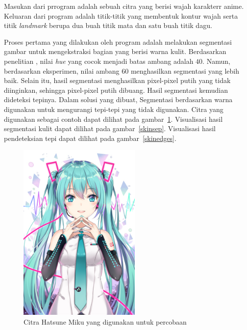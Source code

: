 \documentclass[conference, a4paper]{IEEEtran}
\begin{document}
Masukan dari prrogram adalah sebuah citra yang berisi wajah karakterr anime. Keluaran dari program adalah titik-titik yang membentuk kontur wajah serta titik \textit{landmark} berupa dua buah titik mata dan satu buah titik dagu.

Proses pertama yang dilakukan oleh program adalah melakukan segmentasi gambar untuk mengekstraksi bagian yang berisi warna kulit. Berdasarkan penelitian \cite{takayama2012face}, nilai \textit{hue} yang cocok menjadi batas ambang adalah $40$. Namun, berdasarkan eksperimen, nilai ambang $60$ menghasilkan segmentasi yang lebih baik. Selain itu, hasil segmentasi menghasilkan pixel-pixel putih yang tidak diinginkan, sehingga pixel-pixel putih dibuang. Hasil segmentasi kemudian dideteksi tepinya. Dalam solusi yang dibuat, Segmentasi berdasarkan warna digunakan untuk mengurangi tepi-tepi yang tidak digunakan. Citra yang digunakan sebagai contoh dapat dilihat pada gambar~\ref{im1}. Visualisasi hasil segmentasi kulit dapat dilihat pada gambar~\ref{skinsep}. Visualisasi hasil pendeteksian tepi dapat dilihat pada gambar~\ref{skinedges}.

\begin{figure}[ht]
  \begin{center}
    \includegraphics[width=6cm]{img/hatsune_miku.jpg}
  \end{center}
  \caption{Citra Hatsune Miku yang digunakan untuk percobaan}\label{im1}
\end{figure}
\end{document}
